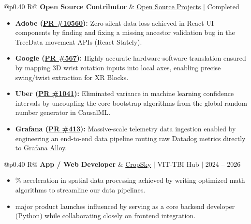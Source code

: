 \documentclass[a4paper,10pt]{article}
\newcommand{\ulink}[2]{\href{#1}{#2}}
\newcommand{\subheading}[1]{{\color[HTML]{0A0A0A}\fontsize{12}{14}\selectfont\bfseries #1}}
\newcommand{\meta}[1]{{\color[HTML]{5C5C5C}\fontsize{10.5}{12.5}\selectfont #1}}
\begin{document}
\begin{tabularx}{\linewidth}{@{}p{0.40\linewidth} R@{}}
\subheading{Open Source Contributor} & \meta{\ulink{https://github.com/su-jin1425/My-Open-Source-Contributions}{Open Source Projects} $|$ Completed}
\end{tabularx}
\begin{itemize}[nosep, leftmargin=1.5em, itemsep=2pt, topsep=2pt]
  \item {\color[HTML]{0A0A0A}\fontsize{11}{14}\selectfont \textbf{Adobe (\ulink{https://github.com/adobe/react-spectrum/pull/10560}{PR \#10560}):} Zero silent data loss achieved in React UI components by finding and fixing a missing ancestor validation bug in the TreeData movement APIs (React Stately).}
  \item {\color[HTML]{0A0A0A}\fontsize{11}{14}\selectfont \textbf{Google (\ulink{https://github.com/google/xrblocks/pull/567}{PR \#567}):} Highly accurate hardware-software translation ensured by mapping 3D wrist rotation inputs into local axes, enabling precise swing/twist extraction for XR Blocks.}
  \item {\color[HTML]{0A0A0A}\fontsize{11}{14}\selectfont \textbf{Uber (\ulink{https://github.com/uber/causalml/pull/1041}{PR \#1041}):} Eliminated variance in machine learning confidence intervals by uncoupling the core bootstrap algorithms from the global random number generator in CausalML.}
  \item {\color[HTML]{0A0A0A}\fontsize{11}{14}\selectfont \textbf{Grafana (\ulink{https://github.com/grafana/alloy-scenarios/pull/413}{PR \#413}):} Massive-scale telemetry data ingestion enabled by engineering an end-to-end data pipeline routing raw Datadog metrics directly to Grafana Alloy.}
\end{itemize}

\begin{tabularx}{\linewidth}{@{}p{0.40\linewidth} R@{}}
\subheading{App / Web Developer} & \meta{\ulink{https://sites.google.com/view/cropsky/home}{CropSky} $|$ VIT-TBI Hub $|$ 2024 -- 2026}
\end{tabularx}
\begin{itemize}[nosep, leftmargin=1.5em, itemsep=2pt, topsep=2pt]
  \item {\color[HTML]{0A0A0A}\fontsize{11}{14}\% acceleration in spatial data processing achieved by writing optimized math algorithms to streamline our data pipelines.}
  \item {\color[HTML]{0A0A0A}\fontsize{11}{14} major product launches influenced by serving as a core backend developer (Python) while collaborating closely on frontend integration.}
\end{itemize}
\end{document}

